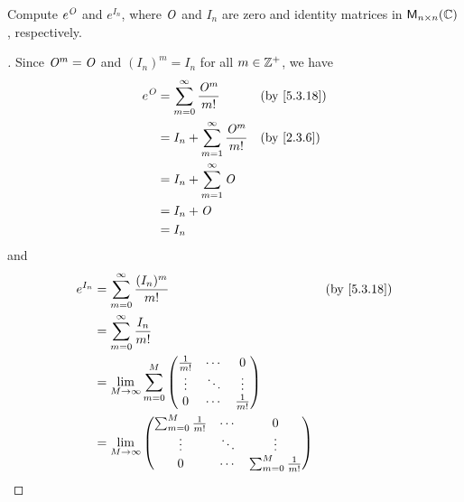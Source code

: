 \begin{ex}\label{ex:5.3.20}
  Compute \(e^{\mathit{O}}\) and \(e^{I_n}\), where \(\mathit{O}\) and \(I_n\) are zero and identity matrices in \(\ms[n][n][\C]\), respectively.
\end{ex}

\begin{proof}[]
  Since \(\mathit{O}^m = \mathit{O}\) and \((I_n)^m = I_n\) for all \(m \in \mathbb{Z}^+\), we have
  \begin{align*}
    e^{\zm} & = \sum_{m = 0}^\infty \frac{\zm^m}{m!}       &  & \by{5.3.18} \\
            & = I_n + \sum_{m = 1}^\infty \frac{\zm^m}{m!} &  & \by{2.3.6}  \\
            & = I_n + \sum_{m = 1}^\infty \zm                               \\
            & = I_n + \zm                                                   \\
            & = I_n
  \end{align*}
  and
  \begin{align*}
    e^{I_n} & = \sum_{m = 0}^\infty \frac{(I_n)^m}{m!}                                                                      &  & \by{5.3.18} \\
            & = \sum_{m = 0}^\infty \frac{I_n}{m!}                                                                                           \\
            & = \Lim_{M \to \infty} \sum_{m = 0}^M \begin{pmatrix}
                                                     \frac{1}{m!} & \cdots & 0            \\
                                                     \vdots       & \ddots & \vdots       \\
                                                     0            & \cdots & \frac{1}{m!}
                                                   \end{pmatrix}                                                      \\
            & = \Lim_{M \to \infty} \begin{pmatrix}
                                      \sum_{m = 0}^M  \frac{1}{m!} & \cdots & 0                           \\
                                      \vdots                       & \ddots & \vdots                      \\
                                      0                            & \cdots & \sum_{m = 0}^M \frac{1}{m!}

\end{pmatrix}
\end{align*}
\end{proof}
